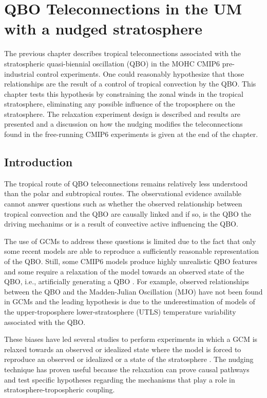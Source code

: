 \chapter{\label{ch:7-nudging} QBO Teleconnections in the UM with a nudged stratosphere }

The previous chapter describes tropical teleconnections associated with the stratospheric quasi-biennial oscillation (QBO) in the MOHC CMIP6 pre-industrial control experiments. One could reasonably hypothesize that those relationships are the result of a control of tropical convection by the QBO. 
This chapter tests this hypothesis by constraining the zonal winds in the tropical stratosphere, eliminating any possible influence of the troposphere on the stratosphere. 
The relaxation experiment design is described and results are presented and a discussion on how the nudging modifies the teleconnections found in the free-running CMIP6 experiments is given at the end of the chapter. 

\section{Introduction}

The tropical route of QBO teleconnections remains relatively less understood than the polar and subtropical routes. The observational evidence available \citep[e.g.][]{collimore2003,liess2012,schirber2015,gray2018} cannot answer questions such as whether the observed relationship between tropical convection and the QBO are causally linked and if so, is the QBO the driving mechanims or is a result of convective active influencing the QBO.

The use of GCMs to address these questions is limited due to the fact that only some recent models are able to reproduce a sufficiently reasonable representation of the QBO. Still, some CMIP6 models produce highly unrealistic QBO features and some require a relaxation of the model towards an observed state of the QBO, i.e., artificially generating a QBO \citep{richter2020}. 
For example, observed relationships between the QBO and the Madden-Julian Oscillation (MJO) \citep[e.g.][]{son2017,wang2019} have not been found in GCMs \citep{lee2018,kim2020,martin2021} and the leading hypothesis is due to the underestimation of models of the upper-troposphere lower-stratosphere (UTLS) temperature variability associated with the QBO. 

These biases have led several studies to perform experiments in which a GCM is relaxed towards an observed or idealized state where the model is forced to reproduce an observed or idealized  or a state of the stratosphere \citep{gray2020,richter2020,martin2021}. 
The nudging technique has proven useful because the relaxation can prove causal pathways and test specific hypotheses regarding the mechanisms that play a role in stratosphere-tropospheric coupling. 


